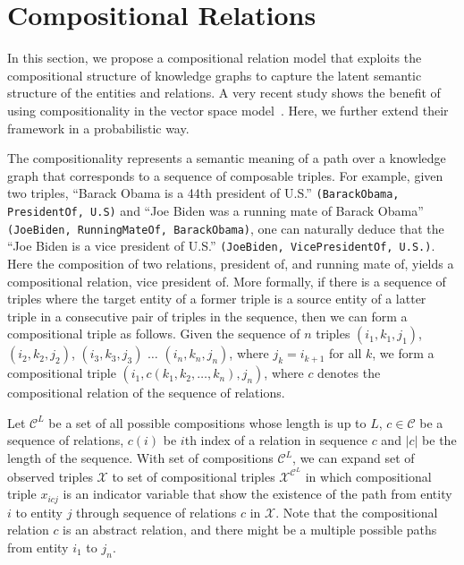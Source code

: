 \section{Compositional Relations}
\label{sec:comp}

In this section, we propose a compositional relation model that exploits the compositional structure of
knowledge graphs to capture the latent semantic structure of the entities and relations.
A very recent study shows the benefit of using compositionality in the vector space model~\cite{guu2015traversing}. Here, we further extend their framework in a probabilistic way.

The compositionality represents a semantic meaning of a path over a knowledge graph that corresponds to a
sequence of composable triples.
For example, given two triples, ``Barack Obama is a 44th president of U.S.'' \texttt{(BarackObama, PresidentOf,
U.S)} and ``Joe Biden was a running mate of Barack Obama'' \texttt{(JoeBiden, RunningMateOf, BarackObama)},
one can naturally deduce that the ``Joe Biden is a vice president of U.S.'' \texttt{(JoeBiden, VicePresidentOf, U.S.)}.
Here the composition of two relations, president of, and running mate of, yields a compositional relation,
vice president of.
More formally, if there is a sequence of triples where the target entity of a former triple is a source entity of a
latter triple in a consecutive pair of triples in the sequence, then we can form a compositional triple
as follows.
Given the sequence of $n$ triples
$(i_1, k_1 ,j_1)$,  $(i_2, k_2, j_2)$, $(i_3, k_3, j_3)$ $\dots$ $(i_n, k_n, j_n)$, where $j_{k}=i_{k+1}$ for all $k$,  we form a compositional triple $(i_1, {c}(k_1, k_2, \dots, k_n), j_n)$, where $c$ denotes the compositional
relation of the sequence of relations.

Let $\mathcal{C}^{L}$ be a set of all possible compositions whose length is up to $L$, $c \in \mathcal{C}$
be a sequence of relations, $c(i)$ be $i$th index of a relation in sequence $c$ and $|c|$ be the length of the
sequence. With set of compositions $\mathcal{C}^{L}$, we can expand set of observed triples
$\mathcal{X}$ to set of compositional triples $\mathcal{X}^{\mathcal{C}^{L}}$ in which
compositional triple $x_{icj}$ is an
indicator variable that show the existence of the path from entity $i$ to entity $j$ through sequence
of relations
$c$ in $\mathcal{X}$. Note that the compositional relation $c$ is an abstract relation, and there might be a
multiple possible paths from entity $i_1$ to $j_n$.

